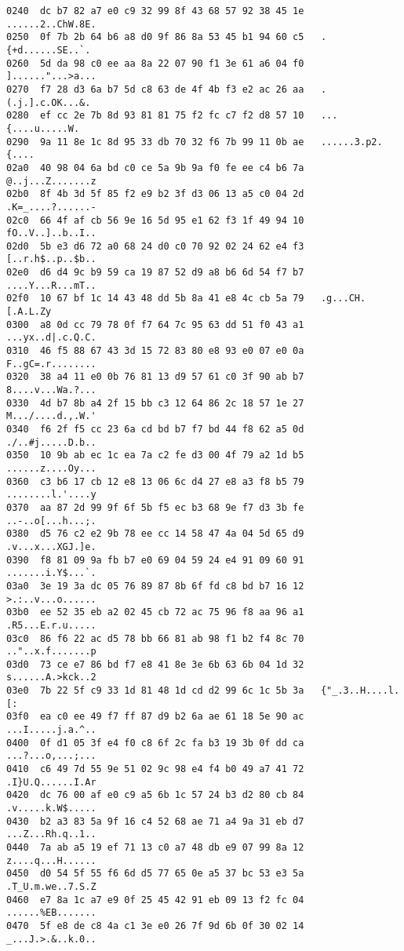 \begin{lstlisting}
0240  dc b7 82 a7 e0 c9 32 99 8f 43 68 57 92 38 45 1e   ......2..ChW.8E.
0250  0f 7b 2b 64 b6 a8 d0 9f 86 8a 53 45 b1 94 60 c5   .{+d......SE..`.
0260  5d da 98 c0 ee aa 8a 22 07 90 f1 3e 61 a6 04 f0   ]......"...>a...
0270  f7 28 d3 6a b7 5d c8 63 de 4f 4b f3 e2 ac 26 aa   .(.j.].c.OK...&.
0280  ef cc 2e 7b 8d 93 81 81 75 f2 fc c7 f2 d8 57 10   ...{....u.....W.
0290  9a 11 8e 1c 8d 95 33 db 70 32 f6 7b 99 11 0b ae   ......3.p2.{....
02a0  40 98 04 6a bd c0 ce 5a 9b 9a f0 fe ee c4 b6 7a   @..j...Z.......z
02b0  8f 4b 3d 5f 85 f2 e9 b2 3f d3 06 13 a5 c0 04 2d   .K=_....?......-
02c0  66 4f af cb 56 9e 16 5d 95 e1 62 f3 1f 49 94 10   fO..V..]..b..I..
02d0  5b e3 d6 72 a0 68 24 d0 c0 70 92 02 24 62 e4 f3   [..r.h$..p..$b..
02e0  d6 d4 9c b9 59 ca 19 87 52 d9 a8 b6 6d 54 f7 b7   ....Y...R...mT..
02f0  10 67 bf 1c 14 43 48 dd 5b 8a 41 e8 4c cb 5a 79   .g...CH.[.A.L.Zy
0300  a8 0d cc 79 78 0f f7 64 7c 95 63 dd 51 f0 43 a1   ...yx..d|.c.Q.C.
0310  46 f5 88 67 43 3d 15 72 83 80 e8 93 e0 07 e0 0a   F..gC=.r........
0320  38 a4 11 e0 0b 76 81 13 d9 57 61 c0 3f 90 ab b7   8....v...Wa.?...
0330  4d b7 8b a4 2f 15 bb c3 12 64 86 2c 18 57 1e 27   M.../....d.,.W.'
0340  f6 2f f5 cc 23 6a cd bd b7 f7 bd 44 f8 62 a5 0d   ./..#j.....D.b..
0350  10 9b ab ec 1c ea 7a c2 fe d3 00 4f 79 a2 1d b5   ......z....Oy...
0360  c3 b6 17 cb 12 e8 13 06 6c d4 27 e8 a3 f8 b5 79   ........l.'....y
0370  aa 87 2d 99 9f 6f 5b f5 ec b3 68 9e f7 d3 3b fe   ..-..o[...h...;.
0380  d5 76 c2 e2 9b 78 ee cc 14 58 47 4a 04 5d 65 d9   .v...x...XGJ.]e.
0390  f8 81 09 9a fb b7 e0 69 04 59 24 e4 91 09 60 91   .......i.Y$...`.
03a0  3e 19 3a dc 05 76 89 87 8b 6f fd c8 bd b7 16 12   >.:..v...o......
03b0  ee 52 35 eb a2 02 45 cb 72 ac 75 96 f8 aa 96 a1   .R5...E.r.u.....
03c0  86 f6 22 ac d5 78 bb 66 81 ab 98 f1 b2 f4 8c 70   .."..x.f.......p
03d0  73 ce e7 86 bd f7 e8 41 8e 3e 6b 63 6b 04 1d 32   s......A.>kck..2
03e0  7b 22 5f c9 33 1d 81 48 1d cd d2 99 6c 1c 5b 3a   {"_.3..H....l.[:
03f0  ea c0 ee 49 f7 ff 87 d9 b2 6a ae 61 18 5e 90 ac   ...I.....j.a.^..
0400  0f d1 05 3f e4 f0 c8 6f 2c fa b3 19 3b 0f dd ca   ...?...o,...;...
0410  c6 49 7d 55 9e 51 02 9c 98 e4 f4 b0 49 a7 41 72   .I}U.Q......I.Ar
0420  dc 76 00 af e0 c9 a5 6b 1c 57 24 b3 d2 80 cb 84   .v.....k.W$.....
0430  b2 a3 83 5a 9f 16 c4 52 68 ae 71 a4 9a 31 eb d7   ...Z...Rh.q..1..
0440  7a ab a5 19 ef 71 13 c0 a7 48 db e9 07 99 8a 12   z....q...H......
0450  d0 54 5f 55 f6 6d d5 77 65 0e a5 37 bc 53 e3 5a   .T_U.m.we..7.S.Z
0460  e7 8a 1c a7 e9 0f 25 45 42 91 eb 09 13 f2 fc 04   ......%EB.......
0470  5f e8 de c8 4a c1 3e e0 26 7f 9d 6b 0f 30 02 14   _...J.>.&..k.0..

\end{lstlisting}
